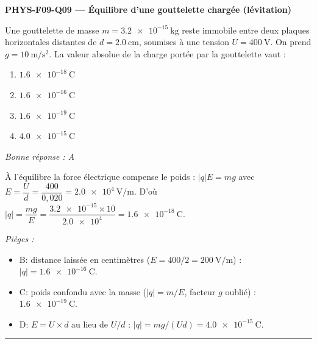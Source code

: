 \documentclass[11pt,a4paper]{article}
\newcommand{\vv}[1]{\vec{#1}}\newcommand{\ds}{\displaystyle}
\begin{document}
\noindent\textbf{PHYS-F09-Q09 --- Équilibre d'une gouttelette chargée (lévitation)}\par
Une gouttelette de masse $m=\qty{3.2e-15}{\kilogram}$ reste immobile entre deux plaques horizontales distantes de $d=\qty{2.0}{\centi\metre}$, soumises à une tension $U=\qty{400}{\volt}$. On prend $g=\qty{10}{\metre\per\second\squared}$. La valeur absolue de la charge portée par la gouttelette vaut :
\begin{center}
\end{center}
\begin{enumerate}[label=\Alph*)]
\item $\qty{1.6e-18}{\coulomb}$
\item $\qty{1.6e-16}{\coulomb}$
\item $\qty{1.6e-19}{\coulomb}$
\item $\qty{4.0e-15}{\coulomb}$
\end{enumerate}
\textit{Bonne réponse : A}\par
À l'équilibre la force électrique compense le poids : $|q|E=mg$ avec $E=\dfrac{U}{d}=\dfrac{400}{0{,}020}=\qty{2.0e4}{\volt\per\metre}$. D'où $|q|=\dfrac{mg}{E}=\dfrac{\num{3.2e-15}\times 10}{\num{2.0e4}}=\qty{1.6e-18}{\coulomb}$.\par
\textit{Pièges :}
\begin{itemize}
\item B: distance laissée en centimètres ($E=400/2=\qty{200}{\volt\per\metre}$) : $|q|=\qty{1.6e-16}{\coulomb}$.
\item C: poids confondu avec la masse ($|q|=m/E$, facteur $g$ oublié) : $\qty{1.6e-19}{\coulomb}$.
\item D: $E=U\times d$ au lieu de $U/d$ : $|q|=mg/(U d)=\qty{4.0e-15}{\coulomb}$.
\end{itemize}
\vspace{8pt}\hrule\vspace{8pt}
\end{document}
